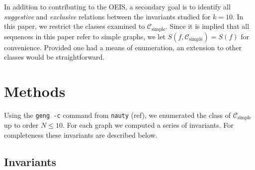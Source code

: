 \documentclass[12pt]{article}
\newcommand{\SIMPLECLASS}{\mathcal{C}_\text{simple}}
\begin{document}
In addition to contributing to the OEIS, a secondary goal is to identify all \textit{suggestive} and \textit{exclusive} relations between the invariants studied for $k=10$. In this paper, we restrict the classes examined to $\SIMPLECLASS$. Since it is implied that all sequences in this paper refer to simple graphs, we let $S(f,\SIMPLECLASS)=S(f)$ for convenience. Provided one had a means of enumeration, an extension to other classes would be straightforward.


\section{Methods}
Using the \texttt{geng -c} command from \texttt{nauty} (ref), we enumerated the class of $\SIMPLECLASS$ up to order $N \le 10$.
For each graph we computed a series of invariants.
For completeness these invariants are described below.

\subsection{Invariants}
\end{document}
